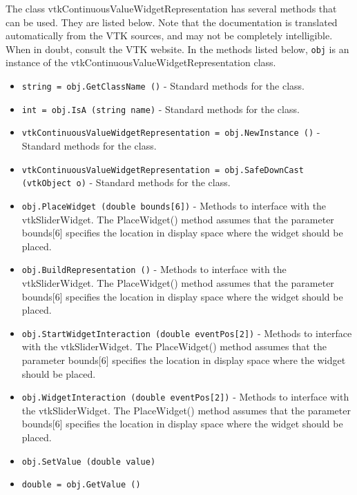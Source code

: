 The class vtkContinuousValueWidgetRepresentation has several methods that can be used.
  They are listed below.
Note that the documentation is translated automatically from the VTK sources,
and may not be completely intelligible.  When in doubt, consult the VTK website.
In the methods listed below, \verb|obj| is an instance of the vtkContinuousValueWidgetRepresentation class.
\begin{itemize}
\item  \verb|string = obj.GetClassName ()| -  Standard methods for the class.

\item  \verb|int = obj.IsA (string name)| -  Standard methods for the class.

\item  \verb|vtkContinuousValueWidgetRepresentation = obj.NewInstance ()| -  Standard methods for the class.

\item  \verb|vtkContinuousValueWidgetRepresentation = obj.SafeDownCast (vtkObject o)| -  Standard methods for the class.

\item  \verb|obj.PlaceWidget (double bounds[6])| -  Methods to interface with the vtkSliderWidget. The PlaceWidget() method
 assumes that the parameter bounds[6] specifies the location in display
 space where the widget should be placed.

\item  \verb|obj.BuildRepresentation ()| -  Methods to interface with the vtkSliderWidget. The PlaceWidget() method
 assumes that the parameter bounds[6] specifies the location in display
 space where the widget should be placed.

\item  \verb|obj.StartWidgetInteraction (double eventPos[2])| -  Methods to interface with the vtkSliderWidget. The PlaceWidget() method
 assumes that the parameter bounds[6] specifies the location in display
 space where the widget should be placed.

\item  \verb|obj.WidgetInteraction (double eventPos[2])| -  Methods to interface with the vtkSliderWidget. The PlaceWidget() method
 assumes that the parameter bounds[6] specifies the location in display
 space where the widget should be placed.

\item  \verb|obj.SetValue (double value)|

\item  \verb|double = obj.GetValue ()|

\end{itemize}
